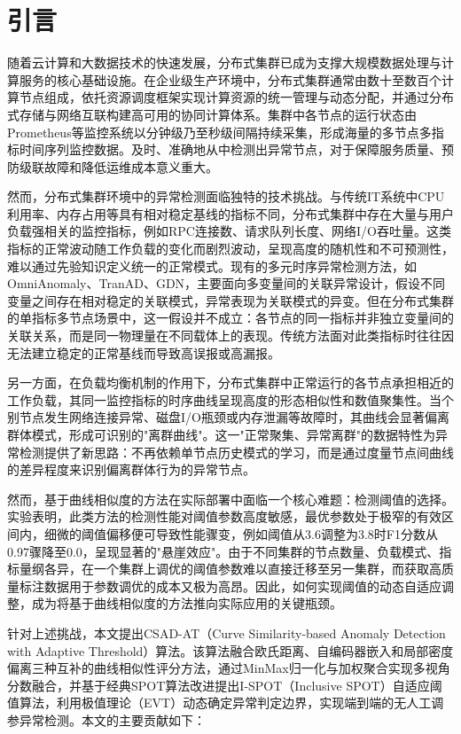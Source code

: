 \documentclass[10.5pt,a4paper,twocolumn]{ctexart}
\begin{document}
\section*{引言}

随着云计算和大数据技术的快速发展，分布式集群已成为支撑大规模数据处理与计算服务的核心基础设施\cite{hundman2018detecting}。在企业级生产环境中，分布式集群通常由数十至数百个计算节点组成，依托资源调度框架实现计算资源的统一管理与动态分配，并通过分布式存储与网络互联构建高可用的协同计算体系。集群中各节点的运行状态由Prometheus等监控系统以分钟级乃至秒级间隔持续采集，形成海量的多节点多指标时间序列监控数据。及时、准确地从中检测出异常节点，对于保障服务质量、预防级联故障和降低运维成本意义重大。

然而，分布式集群环境中的异常检测面临独特的技术挑战。与传统IT系统中CPU利用率、内存占用等具有相对稳定基线的指标不同，分布式集群中存在大量与用户负载强相关的监控指标，例如RPC连接数、请求队列长度、网络I/O吞吐量。这类指标的正常波动随工作负载的变化而剧烈波动，呈现高度的随机性和不可预测性，难以通过先验知识定义统一的正常模式。现有的多元时序异常检测方法，如OmniAnomaly\cite{su2019omni}、TranAD\cite{tuli2022tranad}、GDN\cite{deng2021graph}，主要面向多变量间的关联异常设计，假设不同变量之间存在相对稳定的关联模式，异常表现为关联模式的异变。但在分布式集群的单指标多节点场景中，这一假设并不成立：各节点的同一指标并非独立变量间的关联关系，而是同一物理量在不同载体上的表现。传统方法面对此类指标时往往因无法建立稳定的正常基线而导致高误报或高漏报。

另一方面，在负载均衡机制的作用下，分布式集群中正常运行的各节点承担相近的工作负载，其同一监控指标的时序曲线呈现高度的形态相似性和数值聚集性。当个别节点发生网络连接异常、磁盘I/O瓶颈或内存泄漏等故障时，其曲线会显著偏离群体模式，形成可识别的"离群曲线"。这一"正常聚集、异常离群"的数据特性为异常检测提供了新思路：不再依赖单节点历史模式的学习，而是通过度量节点间曲线的差异程度来识别偏离群体行为的异常节点。

然而，基于曲线相似度的方法在实际部署中面临一个核心难题：检测阈值的选择。实验表明，此类方法的检测性能对阈值参数高度敏感，最优参数处于极窄的有效区间内，细微的阈值偏移便可导致性能骤变，例如阈值从3.6调整为3.8时F1分数从0.97骤降至0.0，呈现显著的"悬崖效应"。由于不同集群的节点数量、负载模式、指标量纲各异，在一个集群上调优的阈值参数难以直接迁移至另一集群，而获取高质量标注数据用于参数调优的成本又极为高昂。因此，如何实现阈值的动态自适应调整，成为将基于曲线相似度的方法推向实际应用的关键瓶颈。

针对上述挑战，本文提出CSAD-AT（Curve Similarity-based Anomaly Detection with Adaptive Threshold）算法。该算法融合欧氏距离、自编码器嵌入和局部密度偏离三种互补的曲线相似性评分方法，通过MinMax归一化与加权聚合实现多视角分数融合，并基于经典SPOT算法\cite{siffer2017spot}改进提出I-SPOT（Inclusive SPOT）自适应阈值算法，利用极值理论（EVT）动态确定异常判定边界，实现端到端的无人工调参异常检测。本文的主要贡献如下：
\end{document}
